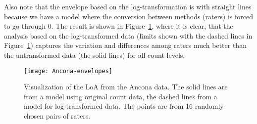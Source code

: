 \documentclass[aoas]{imsart}
\makeatletter
\newcommand{\code}[1]{\texttt{#1}\@\xspace}
\makeatother
\begin{document}
Also note that the envelope based on the log-transformation is with
straight lines because we have a model where the conversion between
methods (raters) is forced to go through 0. The result is shown in
Figure~\ref{fig:envelopes}, where it is clear, that the analysis based
on the log-transformed data (limits shown with the dashed lines in
Figure~\ref{fig:envelopes}) captures the variation and differences
among raters much better than the untransformed data (the solid
lines) for all count levels.
\begin{figure}%
  \centering
  \texttt{[image: Ancona-envelopes]}
  \caption{Visualization of the LoA from the Ancona data. The
    solid lines are from a model using original count data, the dashed
    lines from a model for log-transformed data.
    The points are from 16 randomly chosen
    pairs of raters.}
\label{fig:envelopes}
\end{figure}

\end{document}
